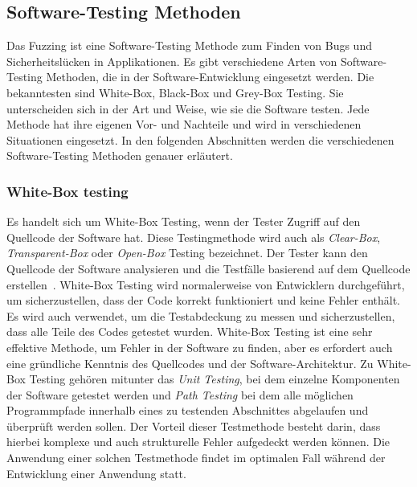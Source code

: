 
\subsection{Software-Testing Methoden}\label{subsec:software-testing-methoden}
Das Fuzzing ist eine Software-Testing Methode zum Finden von Bugs und Sicherheitslücken in Applikationen.
Es gibt verschiedene Arten von Software-Testing Methoden, die in der Software-Entwicklung eingesetzt werden.
Die bekanntesten sind White-Box, Black-Box und Grey-Box Testing.
Sie unterscheiden sich in der Art und Weise, wie sie die Software testen.
Jede Methode hat ihre eigenen Vor- und Nachteile und wird in verschiedenen Situationen eingesetzt.
In den folgenden Abschnitten werden die verschiedenen Software-Testing Methoden genauer erläutert.
\subsubsection{White-Box testing}\label{subsubsec:white-box-testing}
Es handelt sich um White-Box Testing, wenn der Tester Zugriff auf den Quellcode der Software hat.
Diese Testingmethode wird auch als \textit{Clear-Box}, \textit{Transparent-Box} oder \textit{Open-Box} Testing bezeichnet.
Der Tester kann den Quellcode der Software analysieren und die Testfälle basierend auf dem Quellcode erstellen~\cite{white-box-testing}.
White-Box Testing wird normalerweise von Entwicklern durchgeführt, um sicherzustellen, dass der Code korrekt funktioniert und keine Fehler enthält.
Es wird auch verwendet, um die Testabdeckung zu messen und sicherzustellen, dass alle Teile des Codes getestet wurden.
White-Box Testing ist eine sehr effektive Methode, um Fehler in der Software zu finden,
aber es erfordert auch eine gründliche Kenntnis des Quellcodes und der Software-Architektur.
Zu White-Box Testing gehören mitunter das \textit{Unit Testing}, bei dem einzelne Komponenten der Software getestet werden
und \textit{Path Testing} bei dem alle möglichen Programmpfade innerhalb eines zu testenden Abschnittes abgelaufen und überprüft werden sollen.\newline
Der Vorteil dieser Testmethode besteht darin, dass hierbei komplexe und auch strukturelle Fehler aufgedeckt werden können.
Die Anwendung einer solchen Testmethode findet im optimalen Fall während der Entwicklung einer Anwendung statt.
